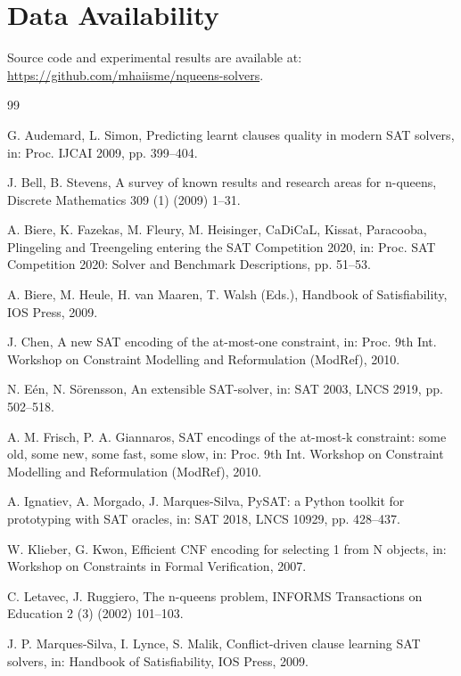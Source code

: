 \documentclass[a4paper,fleqn]{cas-sc}
\begin{document}
\section*{Data Availability}
Source code and experimental results are available at: \url{https://github.com/mhaiisme/nqueens-solvers}.

\begin{thebibliography}{99}

 G. Audemard, L. Simon, Predicting learnt clauses quality in modern SAT solvers, in: Proc. IJCAI 2009, pp. 399--404.

 J. Bell, B. Stevens, A survey of known results and research areas for n-queens, Discrete Mathematics 309 (1) (2009) 1--31.

 A. Biere, K. Fazekas, M. Fleury, M. Heisinger, CaDiCaL, Kissat, Paracooba, Plingeling and Treengeling entering the SAT Competition 2020, in: Proc. SAT Competition 2020: Solver and Benchmark Descriptions, pp. 51--53.

 A. Biere, M. Heule, H. van Maaren, T. Walsh (Eds.), Handbook of Satisfiability, IOS Press, 2009.

 J. Chen, A new SAT encoding of the at-most-one constraint, in: Proc. 9th Int. Workshop on Constraint Modelling and Reformulation (ModRef), 2010.

 N. E\'en, N. S\"orensson, An extensible SAT-solver, in: SAT 2003, LNCS 2919, pp. 502--518.

 A. M. Frisch, P. A. Giannaros, SAT encodings of the at-most-k constraint: some old, some new, some fast, some slow, in: Proc. 9th Int. Workshop on Constraint Modelling and Reformulation (ModRef), 2010.

 A. Ignatiev, A. Morgado, J. Marques-Silva, PySAT: a Python toolkit for prototyping with SAT oracles, in: SAT 2018, LNCS 10929, pp. 428--437.

 W. Klieber, G. Kwon, Efficient CNF encoding for selecting 1 from N objects, in: Workshop on Constraints in Formal Verification, 2007.

 C. Letavec, J. Ruggiero, The n-queens problem, INFORMS Transactions on Education 2 (3) (2002) 101--103.

 J. P. Marques-Silva, I. Lynce, S. Malik, Conflict-driven clause learning SAT solvers, in: Handbook of Satisfiability, IOS Press, 2009.


\end{thebibliography}
\end{document}
